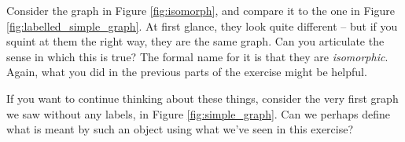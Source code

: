 \documentclass[nobib]{tufte-handout}
\begin{document}
\begin{xca}
    Consider the graph in Figure \ref{fig:isomorph}, and compare it to the one in Figure \ref{fig:labelled_simple_graph}. At first glance, they look quite different -- but if you squint at them the right way, they are the same graph. Can you articulate the sense in which this is true? The formal name for it is that they are \emph{isomorphic}. Again, what you did in the previous parts of the exercise might be helpful.
\end{xca}

If you want to continue thinking about these things, consider the very first graph we saw without any labels, in Figure \ref{fig:simple_graph}. Can we perhaps define what is meant by such an object using what we've seen in this exercise?

%
%
\end{document}
